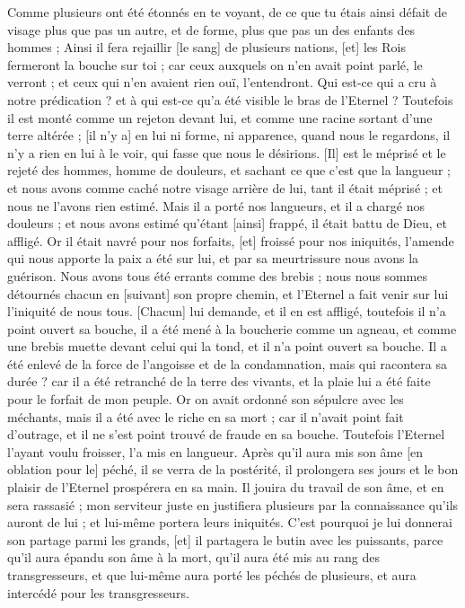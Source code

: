 \begin{multicols}{2}
Comme plusieurs ont été étonnés en te voyant, de ce que tu étais ainsi défait de visage plus que pas un autre, et de forme, plus que pas un des enfants des hommes ;
Ainsi il fera rejaillir [le sang] de plusieurs nations, [et] les Rois fermeront la bouche sur toi ; car ceux auxquels on n'en avait point parlé, le verront ; et ceux qui n'en avaient rien ouï, l'entendront.
\VerseOne{}Qui est-ce qui a cru à notre prédication ? et à qui est-ce qu'a été visible le bras de l'Eternel ?
Toutefois il est monté comme un rejeton devant lui, et comme une racine sortant d'une terre altérée ; [il n'y a] en lui ni forme, ni apparence, quand nous le regardons, il n'y a rien en lui à le voir, qui fasse que nous le désirions.
[Il] est le méprisé et le rejeté des hommes, homme de douleurs, et sachant ce que c'est que la langueur ; et nous avons comme caché notre visage arrière de lui, tant il était méprisé ; et nous ne l'avons rien estimé.
Mais il a porté nos langueurs, et il a chargé nos douleurs ; et nous avons estimé qu'étant [ainsi] frappé, il était battu de Dieu, et affligé.
Or il était navré pour nos forfaits, [et] froissé pour nos iniquités, l'amende qui nous apporte la paix a été sur lui, et par sa meurtrissure nous avons la guérison.
Nous avons tous été errants comme des brebis ; nous nous sommes détournés chacun en [suivant] son propre chemin, et l'Eternel a fait venir sur lui l'iniquité de nous tous.
[Chacun] lui demande, et il en est affligé, toutefois il n'a point ouvert sa bouche, il a été mené à la boucherie comme un agneau, et comme une brebis muette devant celui qui la tond, et il n'a point ouvert sa bouche.
Il a été enlevé de la force de l'angoisse et de la condamnation, mais qui racontera sa durée ? car il a été retranché de la terre des vivants, et la plaie lui a été faite pour le forfait de mon peuple.
Or on avait ordonné son sépulcre avec les méchants, mais il a été avec le riche en sa mort ; car il n'avait point fait d'outrage, et il ne s'est point trouvé de fraude en sa bouche.
Toutefois l'Eternel l'ayant voulu froisser, l'a mis en langueur. Après qu'il aura mis son âme [en oblation pour le] péché, il se verra de la postérité, il prolongera ses jours et le bon plaisir de l'Eternel prospérera en sa main.
Il jouira du travail de son âme, et en sera rassasié ; mon serviteur juste en justifiera plusieurs par la connaissance qu'ils auront de lui ; et lui-même portera leurs iniquités.
C'est pourquoi je lui donnerai son partage parmi les grands, [et] il partagera le butin avec les puissants, parce qu'il aura épandu son âme à la mort, qu'il aura été mis au rang des transgresseurs, et que lui-même aura porté les péchés de plusieurs, et aura intercédé pour les transgresseurs.

\end{multicols}
